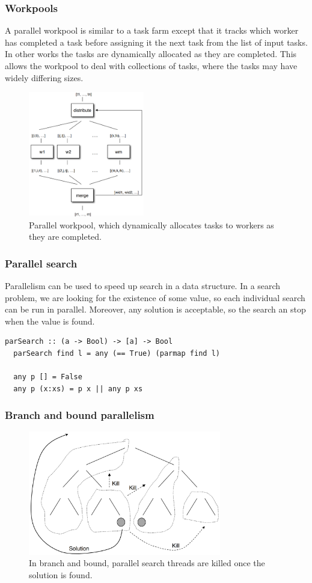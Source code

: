 \documentclass[CS4204-Notes.tex]{subfiles}
\begin{document}
\subsubsection{Workpools}
A parallel workpool is similar to a task farm except that it tracks which worker has completed a task before assigning it the next task from the list of input tasks. In other works the tasks are dynamically allocated as they are completed. This allows the workpool to deal with collections of tasks, where the tasks may have widely differing sizes.
\begin{figure}[H]
  \centering
  \includegraphics[width=0.45\textwidth, keepaspectratio]{imgs/workpool.png}
  \caption{Parallel workpool, which dynamically allocates tasks to workers as they are completed.}
\end{figure}

\subsubsection{Parallel search}
Parallelism can be used to speed up search in a data structure. In a search problem, we are looking for the existence of some value, so each individual search can be run in parallel. Moreover, any solution is acceptable, so the search an stop when the value is found.
\begin{lstlisting}[caption={Parallel search by applying \texttt{parmap} on the \texttt{find} operation.}]
  parSearch :: (a -> Bool) -> [a] -> Bool
  parSearch find l = any (== True) (parmap find l)

  any p [] = False
  any p (x:xs) = p x || any p xs
\end{lstlisting}

\subsubsection{Branch and bound parallelism}
\begin{figure}[H]
  \centering
  \includegraphics[width=0.75\textwidth, keepaspectratio]{imgs/branch-and-bound.png}
  \caption{In branch and bound, parallel search threads are killed once the solution is found.}
\end{figure}
\end{document}
